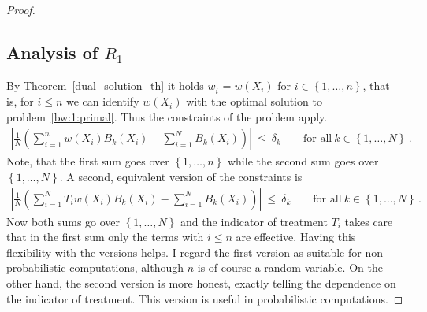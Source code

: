 \begin{proof}
  \subsection*{Analysis of $R_1$}
  By Theorem~\ref{dual_solution_th}
  it holds $w_i^\dagger=w(X_i)$ for $i\in \left\{ 1,\ldots,n \right\}$, that is, for $i\le n$ we can identify $w(X_i)$ with the optimal
  solution to 
  problem~\ref{bw:1:primal}. 
  Thus the constraints of the problem apply.
  \begin{gather}
      \left| 
      \frac{1}{N} 
      \left( 
      \sum_{i = 1}^{n} 
      w(X_i)
      B_k(X_i)
      -
      \sum_{i=1}^{N} 
      B_k(X_i)
      \right)
    \right|
    \ 
    \le 
    \ 
    \delta_k
    \qquad
    \text{for all}\ 
    k \in \left\{ 1, \ldots, N \right\}
    \,.
  \end{gather}
  Note, that the first sum goes over $\left\{ 1,\ldots,n \right\}$ while the second sum goes over $\left\{ 1,\ldots,N \right\}$.
  A second, equivalent version of the constraints is
  \begin{gather}
      \left| 
      \frac{1}{N} 
      \left( 
      \sum_{i = 1}^{N} 
      T_i
      w(X_i)
      B_k(X_i)
      -
      \sum_{i=1}^{N} 
      B_k(X_i)
      \right)
    \right|
    \ 
    \le 
    \ 
    \delta_k
    \qquad
    \text{for all}\ 
    k \in \left\{ 1, \ldots, N \right\}
    \,.
  \end{gather}
  Now both sums go over $\left\{ 1,\ldots,N \right\}$ and the
  indicator of treatment $T_i$ takes care that in the first sum only the terms with $i\le n$ are effective. 
  Having this flexibility with the versions helps. I regard the first version as suitable for non-probabilistic computations, although $n$ is of course a random variable. On the other hand, the second version is more honest, exactly telling the dependence on the indicator of treatment. This version is useful in probabilistic computations. 


\end{proof}
